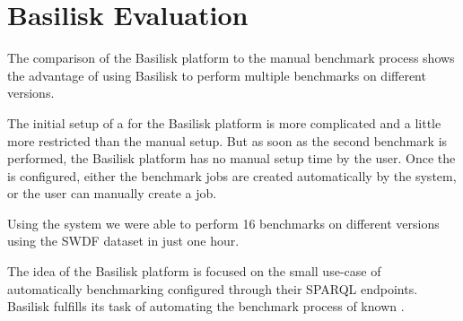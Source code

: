 \section{Basilisk Evaluation}
The comparison of the Basilisk platform to the manual benchmark process shows the advantage of using Basilisk to perform multiple benchmarks on different \ts{} versions.

The initial setup of a \ts{} for the Basilisk platform is more complicated and a little more restricted than the manual setup.
But as soon as the second benchmark is performed, the Basilisk platform has no manual setup time by the user.
Once the \ts{} is configured, either the benchmark jobs are created automatically by the system, or the user can manually create a job.

Using the system we were able to perform 16 benchmarks on different \tentris{} versions using the SWDF dataset in just one hour.





The idea of the Basilisk platform is focused on the small use-case of automatically benchmarking configured \tsp{} through their SPARQL endpoints.
Basilisk fulfills its task of automating the benchmark process of known \ts{}.






